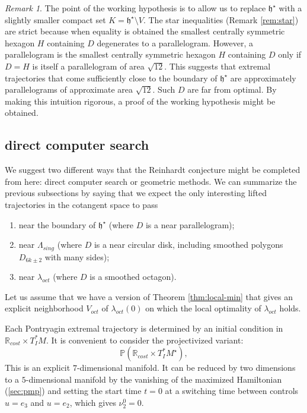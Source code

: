 \documentclass{article}
\theoremstyle{remark}
\newtheorem{remark}[equation]{Remark}%
\newcommand{\ring}[1]{\mathbb{#1}}
\def\hstar{{\mathfrak h}^\star}
\newcommand\Lsing{\Lambda_{sing}}
\begin{document}
\begin{remark} The point of the working hypothesis is to allow us to
  replace $\hstar$ with a slightly smaller compact set
  $K=\hstar\setminus V$.  The star inequalities (Remark
  \ref{rem:star}) are strict because when equality is obtained the
  smallest centrally symmetric hexagon $H$ containing $D$ degenerates
  to a parallelogram.  However, a parallelogram is the smallest
  centrally symmetric hexagon $H$ containing $D$ only if $D=H$ is
  itself a parallelogram of area $\sqrt{12}$.  This suggests that
  extremal trajectories that come sufficiently close to the boundary
  of $\hstar$ are approximately parallelograms of approximate area
  $\sqrt{12}$.  Such $D$ are far from optimal.  By making this
  intuition rigorous, a proof of the working
  hypothesis might be obtained.
\end{remark}

\subsection{direct computer search}

We suggest two different ways that the Reinhardt conjecture might be
completed from here: direct computer search or geometric methods.
We can summarize the previous subsections by saying that we expect
the only interesting lifted trajectories in the cotangent space to pass
\begin{enumerate}
\item near the boundary of $\hstar$ (where $D$ is a near parallelogram);
\item near $\Lsing$ (where $D$ is a near circular disk, including
  smoothed polygons $D_{6k\pm 2}$ with many sides);
\item near $\lambda_{oct}$ (where $D$ is a smoothed octagon).
\end{enumerate}
Let us assume that we have a version of Theorem \ref{thm:local-min} that gives
an explicit neighborhood $V_{oct}$ of $\lambda_{oct}(0)$ on which the
local optimality of $\lambda_{oct}$ holds.

Each Pontryagin extremal trajectory is determined by an initial
condition in $\ring{R}_{cost}\times T_I^*M$.  It is convenient to
consider the projectivized variant:
\[
\ring{P}(\ring{R}_{cost}\times T_I^* M^\star),
\]
This is an explicit $7$-dimensional manifold.  It can be
reduced by two dimensions to a $5$-dimensional manifold
by the vanishing of the maximized
Hamiltonian (\ref{sec:pmp}) and setting the start time $t=0$ at a
switching time between controls $u=e_3$ and $u=e_2$, which
gives $\nu_2^0=0$.
\end{document}

